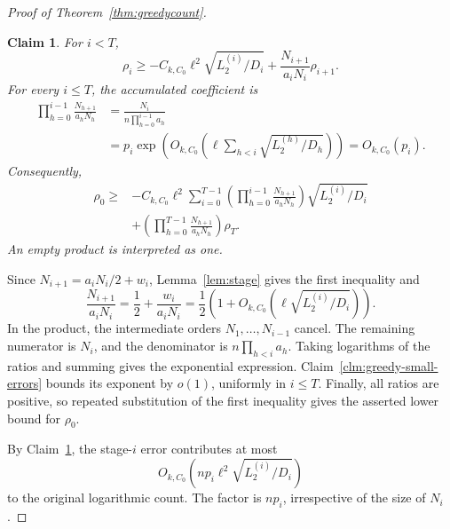 \documentclass[11pt,reqno]{amsart}
\makeatletter
\numberwithin{equation}{section}
\theoremstyle{plain}
\newtheorem{claim}{Claim}[section]
\newenvironment{claimproof}[1][Proof]{\par
    \pushQED{\qed}%
    \renewcommand{\qedsymbol}{$\blacksquare$}
    \normalfont \topsep6\p@\@plus6\p@\relax
    \trivlist
    \item[\hskip\labelsep
    \textit{#1}\@addpunct{.}~]\ignorespaces
}{%
    \popQED\endtrivlist\@endpefalse
}
\theoremstyle{definition}
\makeatother
\begin{document}
\begin{proof}[Proof of Theorem~\ref{thm:greedycount}]
    \begin{claim}\label{clm:greedy-remainder-iteration}
        For $i<T$,
        \[
            \rho_i\ge-C_{k,C_0}\ell^2\sqrt{L_2^{(i)}/D_i}
            +\frac{N_{i+1}}{a_iN_i}\rho_{i+1}.
        \]
        For every $i\le T$, the accumulated coefficient is
        \[
            \begin{aligned}
                \prod_{h=0}^{i-1}\frac{N_{h+1}}{a_hN_h}
                &=\frac{N_i}{n\prod_{h=0}^{i-1}a_h}\\
                &=p_i\exp\left(O_{k,C_0}\left(
                \ell\sum_{h<i}\sqrt{L_2^{(h)}/D_h}\right)\right)
                =O_{k,C_0}(p_i).
            \end{aligned}
        \]
        Consequently,
        \[
            \begin{aligned}
                \rho_0\ge{}&-C_{k,C_0}\ell^2\sum_{i=0}^{T-1}
                \left(\prod_{h=0}^{i-1}\frac{N_{h+1}}{a_hN_h}\right)
                \sqrt{L_2^{(i)}/D_i}\\
                &+\left(\prod_{h=0}^{T-1}\frac{N_{h+1}}{a_hN_h}\right)\rho_T.
            \end{aligned}
        \]
        An empty product is interpreted as one.
    \end{claim}
    \begin{claimproof}[Proof of Claim~\ref{clm:greedy-remainder-iteration}]
        Since $N_{i+1}=a_iN_i/2+w_i$, Lemma~\ref{lem:stage} gives the first inequality and
        \[
            \frac{N_{i+1}}{a_iN_i}
            =\frac12+\frac{w_i}{a_iN_i}
            =\frac12\left(1+O_{k,C_0}(\ell\sqrt{L_2^{(i)}/D_i})\right).
        \]
        In the product, the intermediate orders $N_1,\ldots,N_{i-1}$ cancel.
        The remaining numerator is $N_i$, and the denominator is $n\prod_{h<i}a_h$.
        Taking logarithms of the ratios and summing gives the exponential expression.
        Claim~\ref{clm:greedy-small-errors} bounds its exponent by $o(1)$, uniformly in $i\le T$.
        Finally, all ratios are positive, so repeated substitution of the first inequality gives the asserted lower bound for $\rho_0$.
    \end{claimproof}

    By Claim~\ref{clm:greedy-remainder-iteration}, the stage-$i$ error contributes at most
    \[
        O_{k,C_0}(np_i\ell^2\sqrt{L_2^{(i)}/D_i})
    \]
    to the original logarithmic count.
    The factor is $np_i$, irrespective of the size of $N_i$.


\end{proof}
\end{document}
